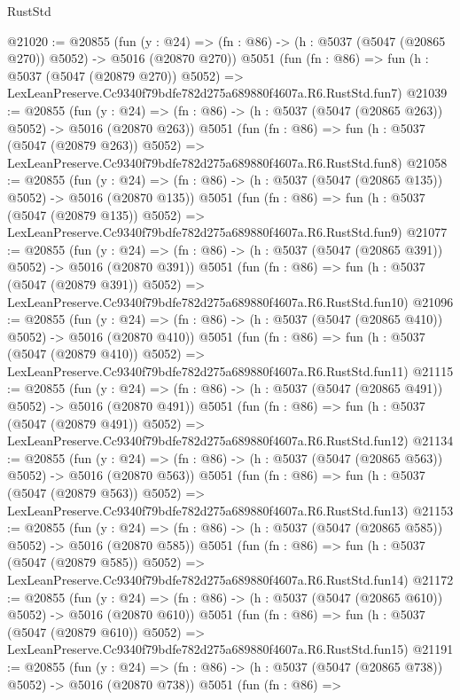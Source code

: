 \begin{lexlean}{RustStd}
\begin{coremodule}
@21020 := @20855
    (fun (y : @24) => (fn : @86) -> (h : @5037 (@5047 (@20865 @270)) @5052) -> @5016 (@20870 @270))
    @5051
    (fun (fn : @86) =>
    fun (h : @5037 (@5047 (@20879 @270)) @5052) =>
    LexLeanPreserve.Cc9340f79bdfe782d275a689880f4607a.R6.RustStd.fun7)
@21039 := @20855
    (fun (y : @24) => (fn : @86) -> (h : @5037 (@5047 (@20865 @263)) @5052) -> @5016 (@20870 @263))
    @5051
    (fun (fn : @86) =>
    fun (h : @5037 (@5047 (@20879 @263)) @5052) =>
    LexLeanPreserve.Cc9340f79bdfe782d275a689880f4607a.R6.RustStd.fun8)
@21058 := @20855
    (fun (y : @24) => (fn : @86) -> (h : @5037 (@5047 (@20865 @135)) @5052) -> @5016 (@20870 @135))
    @5051
    (fun (fn : @86) =>
    fun (h : @5037 (@5047 (@20879 @135)) @5052) =>
    LexLeanPreserve.Cc9340f79bdfe782d275a689880f4607a.R6.RustStd.fun9)
@21077 := @20855
    (fun (y : @24) => (fn : @86) -> (h : @5037 (@5047 (@20865 @391)) @5052) -> @5016 (@20870 @391))
    @5051
    (fun (fn : @86) =>
    fun (h : @5037 (@5047 (@20879 @391)) @5052) =>
    LexLeanPreserve.Cc9340f79bdfe782d275a689880f4607a.R6.RustStd.fun10)
@21096 := @20855
    (fun (y : @24) => (fn : @86) -> (h : @5037 (@5047 (@20865 @410)) @5052) -> @5016 (@20870 @410))
    @5051
    (fun (fn : @86) =>
    fun (h : @5037 (@5047 (@20879 @410)) @5052) =>
    LexLeanPreserve.Cc9340f79bdfe782d275a689880f4607a.R6.RustStd.fun11)
@21115 := @20855
    (fun (y : @24) => (fn : @86) -> (h : @5037 (@5047 (@20865 @491)) @5052) -> @5016 (@20870 @491))
    @5051
    (fun (fn : @86) =>
    fun (h : @5037 (@5047 (@20879 @491)) @5052) =>
    LexLeanPreserve.Cc9340f79bdfe782d275a689880f4607a.R6.RustStd.fun12)
@21134 := @20855
    (fun (y : @24) => (fn : @86) -> (h : @5037 (@5047 (@20865 @563)) @5052) -> @5016 (@20870 @563))
    @5051
    (fun (fn : @86) =>
    fun (h : @5037 (@5047 (@20879 @563)) @5052) =>
    LexLeanPreserve.Cc9340f79bdfe782d275a689880f4607a.R6.RustStd.fun13)
@21153 := @20855
    (fun (y : @24) => (fn : @86) -> (h : @5037 (@5047 (@20865 @585)) @5052) -> @5016 (@20870 @585))
    @5051
    (fun (fn : @86) =>
    fun (h : @5037 (@5047 (@20879 @585)) @5052) =>
    LexLeanPreserve.Cc9340f79bdfe782d275a689880f4607a.R6.RustStd.fun14)
@21172 := @20855
    (fun (y : @24) => (fn : @86) -> (h : @5037 (@5047 (@20865 @610)) @5052) -> @5016 (@20870 @610))
    @5051
    (fun (fn : @86) =>
    fun (h : @5037 (@5047 (@20879 @610)) @5052) =>
    LexLeanPreserve.Cc9340f79bdfe782d275a689880f4607a.R6.RustStd.fun15)
@21191 := @20855
    (fun (y : @24) => (fn : @86) -> (h : @5037 (@5047 (@20865 @738)) @5052) -> @5016 (@20870 @738))
    @5051
    (fun (fn : @86) =>

\end{coremodule}
\end{lexlean}

